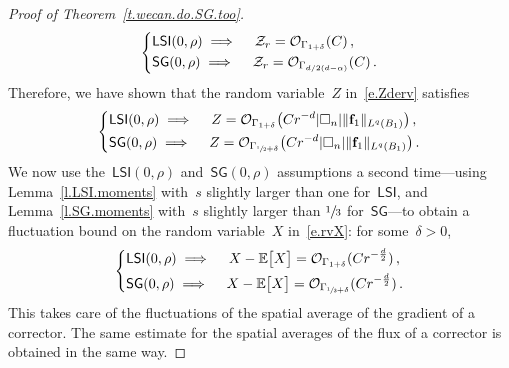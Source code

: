 \documentclass[11pt]{article} %
\let\oldsquare\square %
\renewcommand{\square}{\oldsquare}
\numberwithin{equation}{section}
\theoremstyle{definition}
\let\originalleft\left
\let\originalright\right
\renewcommand{\left}{\mathopen{}\mathclose\bgroup\originalleft}
\renewcommand{\right}{\aftergroup\egroup\originalright}
\newcommand{\f}{\mathbf{f}}
\newcommand{\cu}{\square}
\newcommand{\E}{\mathbb{E}}
\renewcommand{\O}{\mathcal{O}}
\newcommand{\LSI}{\mathsf{LSI}}
\newcommand{\SG}{\mathsf{SG}}
\begin{document}
\begin{proof}[{Proof of Theorem~\ref{t.wecan.do.SG.too}}]
\begin{equation*}
\left\{
\begin{aligned}
& \LSI(0,\rho) 
\implies \quad 
\mathcal{Z}_r = \O_{\Gamma_{1+\delta}}(C)\,, \\
& 
\SG(0,\rho) 
\implies \quad 
\mathcal{Z}_r
= 
\O_{\Gamma_{d/2(d-\alpha)}}(C)\,.
\end{aligned}
\right.
\end{equation*}
Therefore, we have shown that the random variable~$Z$ in~\eqref{e.Zderv} satisfies
\begin{equation*}
\left\{
\begin{aligned}
& \LSI(0,\rho) 
\implies \quad 
Z = \O_{\Gamma_{1+\delta}}
\bigl(Cr^{-d} |\cu_n| \| \f_1\|_{L^q(B_1)}\bigr)
\,, \\
& 
\SG(0,\rho) 
\implies \quad 
Z = \O_{\Gamma_{\sfrac12+\delta}}
\bigl(Cr^{-d} |\cu_n| \| \f_1\|_{L^q(B_1)}\bigr)
\,.
\end{aligned}
\right.
\end{equation*}
We now use the~$\LSI(0,\rho)$ and~$\SG(0,\rho)$ assumptions a second time---using Lemma~\ref{l.LSI.moments} with~$s$ slightly larger than one for~$\LSI$, and Lemma~\ref{l.SG.moments} with~$s$ slightly larger than $\sfrac13$ for~$\SG$---to obtain a fluctuation bound on the random variable~$X$ in~\eqref{e.rvX}: for some~$\delta>0$, 
\begin{equation*}
\left\{
\begin{aligned}
& \LSI(0,\rho) 
\implies \quad 
X - \E \bigl[ X \bigr] = \O_{\Gamma_{1+\delta}}(Cr^{-\frac d2})
\,, \\
& 
\SG(0,\rho) 
\implies \quad 
X - \E \bigl[ X \bigr] = \O_{\Gamma_{\sfrac13+\delta}}(Cr^{-\frac d2})
\,.
\end{aligned}
\right.
\end{equation*}
This takes care of the fluctuations of the spatial average of the gradient of a corrector.
The same estimate for the spatial averages of the flux of a corrector is obtained in the same way.

\smallskip


\end{proof}
\end{document}

